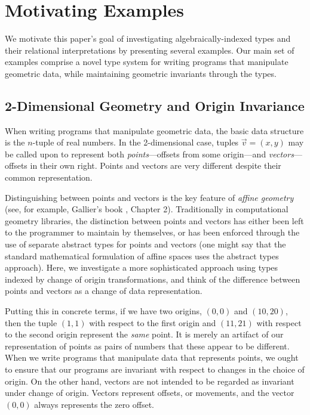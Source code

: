 \section{Motivating Examples}

We motivate this paper's goal of investigating algebraically-indexed
types and their relational interpretations by presenting several
examples. Our main set of examples comprise a novel type system for
writing programs that manipulate geometric data, while maintaining
geometric invariants through the types. 

\subsection{2-Dimensional Geometry and Origin Invariance}

When writing programs that manipulate geometric data, the basic data
structure is the $n$-tuple of real numbers. In the 2-dimensional case,
tuples $\vec{v} = (x,y)$ may be called upon to represent both
\emph{points}---offsets from some origin---and
\emph{vectors}---offsets in their own right. Points and vectors are
very different despite their common representation.

Distinguishing between points and vectors is the key feature of
\emph{affine geometry} (see, for example, Gallier's book
\cite{gallier11geometric}, Chapter 2). Traditionally in computational
geometry libraries, the distinction between points and vectors has
either been left to the programmer to maintain by themselves, or has
been enforced through the use of separate abstract types for points
and vectors (one might say that the standard mathematical formulation
of affine spaces uses the abstract types approach). Here, we
investigate a more sophisticated approach using types indexed by
change of origin transformations, and think of the difference between
points and vectors as a change of data representation.

Putting this in concrete terms, if we have two origins, $(0,0)$ and
$(10,20)$, then the tuple $(1,1)$ with respect to the first origin and
$(11,21)$ with respect to the second origin represent the \emph{same}
point. It is merely an artifact of our representation of points as
pairs of numbers that these appear to be different. When we write
programs that manipulate data that represents points, we ought to
ensure that our programs are invariant with respect to changes in the
choice of origin. On the other hand, vectors are not intended to be
regarded as invariant under change of origin. Vectors represent
offsets, or movements, and the vector $(0,0)$ always represents the
zero offset.

